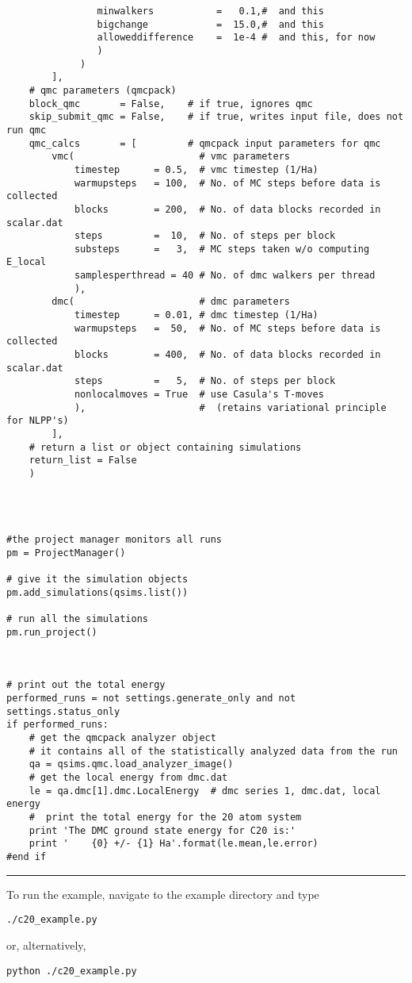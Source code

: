 \documentclass[oneside,11pt]{memoir}
\numberwithin{equation}{section}
\newcommand{\HRule}{\rule{\linewidth}{0.5mm}}
\begin{document}
\begin{verbatim}
                minwalkers           =   0.1,#  and this
                bigchange            =  15.0,#  and this
                alloweddifference    =  1e-4 #  and this, for now
                )
             )
        ],
    # qmc parameters (qmcpack)
    block_qmc       = False,    # if true, ignores qmc
    skip_submit_qmc = False,    # if true, writes input file, does not run qmc
    qmc_calcs       = [         # qmcpack input parameters for qmc
        vmc(                      # vmc parameters 
            timestep      = 0.5,  # vmc timestep (1/Ha)
            warmupsteps   = 100,  # No. of MC steps before data is collected
            blocks        = 200,  # No. of data blocks recorded in scalar.dat
            steps         =  10,  # No. of steps per block
            substeps      =   3,  # MC steps taken w/o computing E_local
            samplesperthread = 40 # No. of dmc walkers per thread
            ),                    
        dmc(                      # dmc parameters
            timestep      = 0.01, # dmc timestep (1/Ha)
            warmupsteps   =  50,  # No. of MC steps before data is collected
            blocks        = 400,  # No. of data blocks recorded in scalar.dat
            steps         =   5,  # No. of steps per block
            nonlocalmoves = True  # use Casula's T-moves
            ),                    #  (retains variational principle for NLPP's)
        ],
    # return a list or object containing simulations
    return_list = False
    )




#the project manager monitors all runs
pm = ProjectManager()  

# give it the simulation objects
pm.add_simulations(qsims.list()) 

# run all the simulations    
pm.run_project()  



# print out the total energy
performed_runs = not settings.generate_only and not settings.status_only
if performed_runs:
    # get the qmcpack analyzer object
    # it contains all of the statistically analyzed data from the run
    qa = qsims.qmc.load_analyzer_image()
    # get the local energy from dmc.dat
    le = qa.dmc[1].dmc.LocalEnergy  # dmc series 1, dmc.dat, local energy
    #  print the total energy for the 20 atom system
    print 'The DMC ground state energy for C20 is:'
    print '    {0} +/- {1} Ha'.format(le.mean,le.error)
#end if
\end{verbatim}
\HRule


To run the example, navigate to the example directory and type
\begin{shaded}
\begin{verbatim}
./c20_example.py
\end{verbatim}
\end{shaded}
or, alternatively, 
\begin{shaded}
\begin{verbatim}
python ./c20_example.py
\end{verbatim}
\end{shaded}
\end{document}
